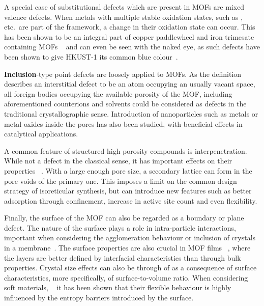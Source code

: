 A special case of substitutional defects which are present in MOFs 
are mixed valence defects. When metals with multiple stable oxidation
states, such as ,  etc.\ are part of 
the framework, a change in their oxidation state can occur. This has
been shown to be an integral part of copper paddlewheel and 
iron trimesate containing MOFs
~\cite{yoonControlledReducibilityMetalOrganic2010} and can even be 
seen with the naked eye, as such defects have been shown 
to give HKUST-1 its common blue colour~\cite{mullerDefectsColorCenters2017}.

\textbf{Inclusion}-type point defects are loosely applied to MOFs. 
As the definition describes an interstitial defect 
to be an atom occupying an usually vacant space, all foreign 
bodies occupying the available porosity of the MOF, including 
aforementioned counterions and solvents could be considered as 
defects in the traditional crystallographic sense.
Introduction of nanoparticles such as metals or metal oxides
inside the pores has also been studied, with beneficial 
effects in catalytical applications.
~\cite{falcaroApplicationMetalMetal2016}

A common feature of structured high porosity compounds is 
interpenetration. While not a defect in the classical sense, 
it has important effects on their properties
~\cite{haldarInterpenetrationCoordinationPolymers2015}.
With a large enough pore size, a secondary lattice can form in the
pore voids of the primary one. This imposes a limit on the 
common design strategy of isoreticular synthesis, but can 
introduce new features such as better adsorption through 
confinement, increase in active site count and even flexibility.

Finally, the surface of the MOF can also be regarded as a 
boundary or plane defect. The nature of the surface plays a role
in intra-particle interactions, important when considering 
the agglomeration behaviour or inclusion of crystals in 
a membrane~\cite{seminoMicroscopicModelMetal2016}.
The surface properties are also crucial in MOF films
~\cite{gliemannEpitaxiallyGrownMetalorganic2012, %
stassenUpdatedRoadmapIntegration2017}, where the layers 
are better defined by interfacial characteristics
than through bulk properties. 
Crystal size effects can also be through of as a consequence
of surface characteristics, more specifically, of surface-to-volume
ratio. When considering soft materials,
~\cite{krauseEffectCrystalliteSize2018, %
vanduyfhuysThermodynamicInsightStimuliresponsive2018} it has 
been shown that their flexible behaviour is highly influenced
by the entropy barriers introduced by the surface.


